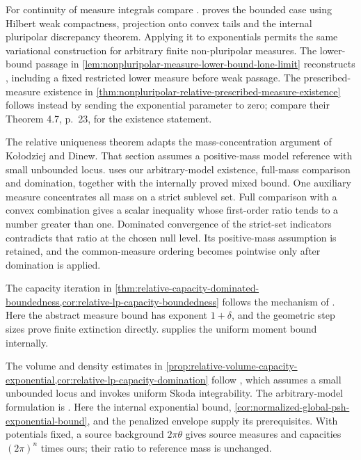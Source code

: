 For continuity of measure integrals compare \cite[Theorem 3.10, pp.~203--205]{BBGZ13}.  proves the bounded case using Hilbert weak compactness, projection onto convex tails and the internal pluripolar discrepancy theorem. Applying it to exponentials permits the same variational construction for arbitrary finite non-pluripolar measures. The lower-bound passage in \cref{lem:nonpluripolar-measure-lower-bound-lone-limit} reconstructs \cite[Lemma 2.8, pp.~12--13]{DDNL2020equationsv3}, including a fixed restricted lower measure before weak passage. The prescribed-measure existence in \cref{thm:nonpluripolar-relative-prescribed-measure-existence} follows instead by sending the exponential parameter to zero; compare their Theorem 4.7, p.~23, for the existence statement.

The relative uniqueness theorem \cite[Theorem 4.29 and complete proof, pp.~2079--2080]{DDNL18mono} adapts the mass-concentration argument of Ko\l{}odziej and Dinew. That section assumes a positive-mass model reference with small unbounded locus.  uses our arbitrary-model existence, full-mass comparison and domination, together with the internally proved mixed bound. One auxiliary measure concentrates all mass on a strict sublevel set. Full comparison with a convex combination gives a scalar inequality whose first-order ratio tends to a number greater than one. Dominated convergence of the strict-set indicators contradicts that ratio at the chosen null level. Its positive-mass assumption is retained, and the common-measure ordering becomes pointwise only after domination is applied.

The capacity iteration in \cref{thm:relative-capacity-dominated-boundedness,cor:relative-lp-capacity-boundedness} follows the mechanism of \cite[Theorem 3.3 and complete proof, pp.~14--15]{DDNL2020equationsv3}. Here the abstract measure bound has exponent $1+\delta$, and the geometric step sizes prove finite extinction directly.  supplies the uniform moment bound internally.

The volume and density estimates in \cref{prop:relative-volume-capacity-exponential,cor:relative-lp-capacity-domination} follow \cite[Proposition 4.30, pp.~2081--2082]{DDNL18mono}, which assumes a small unbounded locus and invokes uniform Skoda integrability. The arbitrary-model formulation is \cite[Lemma 3.9 and Proposition 3.10, p.~18]{DDNL2020equationsv3}. Here the internal exponential bound, \cref{cor:normalized-global-psh-exponential-bound}, and the penalized envelope supply its prerequisites. With potentials fixed, a source background $2\pi\theta$ gives source measures and capacities $(2\pi)^n$ times ours; their ratio to reference mass is unchanged.

